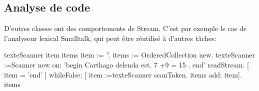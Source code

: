 \subsection{Analyse de code}

D'eutres classes ont des comportements de Stream. C'est par exemple le cas de l'analyseur lexical Smalltalk, qui peut \^etre r\'eutilis\'e \`a d'autres t\^aches:

\begin{scode}
\stBar texteScanner item items \stBar
item := ''. 
items := OrderedCollection new.
texteScanner :=Scanner new on:  'begin Carthago delenda est.  7 +9 = 15 . end' readStream.
[ item = 'end' ]  
   whileFalse: [ item :=texteScanner scanToken. items add: item].
items
\end{scode}
%

\ifx\wholebook\relax\else\fi
